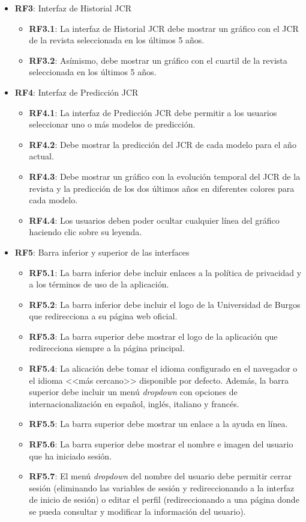 \begin{itemize}
  \newpage
  \item \textbf{RF3}: Interfaz de Historial JCR
  \begin{itemize}
    \item \textbf{RF3.1}: La interfaz de Historial JCR debe mostrar un gráfico con el JCR de la revista seleccionada en los últimos 5 años.
    \item \textbf{RF3.2}: Asímismo, debe mostrar un gráfico con el cuartil de la revista seleccionada en los últimos 5 años.
  \end{itemize}
  
  \item \textbf{RF4}: Interfaz de Predicción JCR
  \begin{itemize}
    \item \textbf{RF4.1}: La interfaz de Predicción JCR debe permitir a los usuarios seleccionar uno o más modelos de predicción.
    \item \textbf{RF4.2}: Debe mostrar la predicción del JCR de cada modelo para el año actual.
    \item \textbf{RF4.3}: Debe mostrar un gráfico con la evolución temporal del JCR de la revista y la predicción de los dos últimos años en diferentes colores para cada modelo.
    \item \textbf{RF4.4}: Los usuarios deben poder ocultar cualquier línea del gráfico haciendo clic sobre su leyenda.
  \end{itemize}
  
  \item \textbf{RF5}: Barra inferior y superior de las interfaces
  \begin{itemize}
    \item \textbf{RF5.1}: La barra inferior debe incluir enlaces a la política de privacidad y a los términos de uso de la aplicación.
    \item \textbf{RF5.2}: La barra inferior debe incluir el logo de la Universidad de Burgos que redirecciona a su página web oficial.
    \item \textbf{RF5.3}: La barra superior debe mostrar el logo de la aplicación que redirecciona siempre a la página principal.
    \item \textbf{RF5.4}: La alicación debe tomar el idioma configurado en el navegador o el idioma <<más cercano>> disponible por defecto. Además, la barra superior debe incluir un menú \textit{dropdown} con opciones de internacionalización en español, inglés, italiano y francés. 
    \item \textbf{RF5.5}: La barra superior debe mostrar un enlace a la ayuda en línea.
    \item \textbf{RF5.6}: La barra superior debe mostrar el nombre e imagen del usuario que ha iniciado sesión.
    \item \textbf{RF5.7}: El menú \textit{dropdown} del nombre del usuario debe permitir cerrar sesión (eliminando las variables de sesión y redireccionando a la interfaz de inicio de sesión) o editar el perfil (redireccionando a una página donde se pueda consultar y modificar la información del usuario).
  \end{itemize}
  

\end{itemize}
